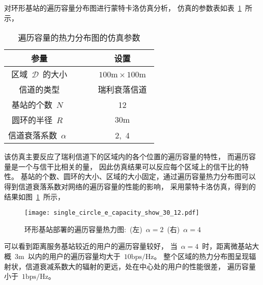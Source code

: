 对环形基站的遍历容量分布图进行蒙特卡洛仿真分析，
仿真的参数表如表~\ref{single_circle_sinr_sim_para}~所示，
\begin{table}[htbp]
\caption{遍历容量的热力分布图的仿真参数}
\label{single_circle_sinr_sim_para}
\vspace{0.5em}\centering\wuhao
\begin{tabular}{cccc}
\toprule[1.5pt]
参量 & & & 设置 \\
\midrule[0.5pt]
区域~$\mathcal{D}$~的大小  & & & ~$100\mathrm{m} \times 100 \mathrm{m}$~ \\
信道的类型 & & &  瑞利衰落信道\\
基站的个数~$N$~ & & &  12\\
圆环的半径~$R$~ & & &  ${30\mathrm{m}}$\\
信道衰落系数~$\alpha$~  & & & 2,~4\\
\bottomrule[1.5pt]
\end{tabular}
\end{table}
该仿真主要反应了瑞利信道下的区域内的各个位置的遍历容量的特性，
而遍历容量是一个与信干比相关的量，
因此仿真结果可以反应每个区域上的信干比的特性。
基站的个数、圆环的大小、区域的大小固定，通过遍历容量热力分布图可以得到信道衰落系数对网络的遍历容量的性能的影响，
采用蒙特卡洛仿真，得到的结果如图~\ref{single_circle_e_capacity_show}~所示，
\begin{figure}[htbp]
\centering
\texttt{[image: single\_circle\_e\_capacity\_show\_30\_12.pdf]}
\caption{环形基站部署的遍历容量热力图:~(左)~$\alpha=2$~(右)~$\alpha=4$}\vspace{-0.5em}
\label{single_circle_e_capacity_show}
\end{figure}
可以看到距离服务基站较近的用户的遍历容量较好，
当~$\alpha=4$~时，距离微基站大概~$3\mathrm{m}$~以内的用户的遍历容量均大于~$10\mathrm{bps/Hz}$。
整个区域的热力分布图呈现辐射状，信道衰减系数大的辐射的更远，处在中心处的用户的性能很差，
遍历容量小于~$1\mathrm{bps/Hz}$。

